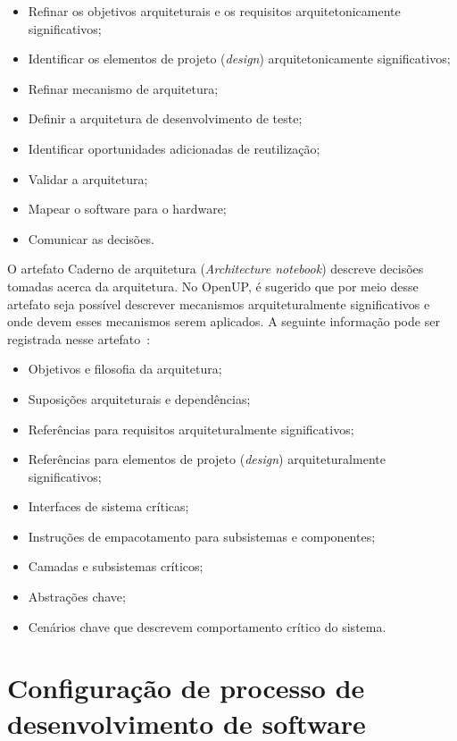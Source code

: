 \begin{itemize}
    \item Refinar os objetivos arquiteturais e os requisitos arquitetonicamente significativos;
    \item Identificar os elementos de projeto (\emph{design}) arquitetonicamente significativos;
    \item Refinar mecanismo de arquitetura;
    \item Definir a arquitetura de desenvolvimento de teste;
    \item Identificar oportunidades adicionadas de reutilização;
    \item Validar a arquitetura;
    \item Mapear o software para o hardware;
    \item Comunicar as decisões.
\end{itemize}

O artefato Caderno de arquitetura (\emph{Architecture notebook}) descreve decisões  tomadas acerca da arquitetura. No OpenUP, é sugerido que por meio desse artefato seja possível descrever mecanismos arquiteturalmente significativos e onde devem esses mecanismos serem aplicados. A seguinte informação pode ser registrada nesse artefato~\cite{openup}:

\begin{itemize}
    \item Objetivos e filosofia da arquitetura;
    \item Suposições arquiteturais e dependências;
    \item Referências para requisitos arquiteturalmente significativos;
    \item Referências para elementos de projeto (\emph{design}) arquiteturalmente significativos;
    \item Interfaces de sistema críticas;
    \item Instruções de empacotamento para subsistemas e componentes;
    \item Camadas e subsistemas críticos;
    \item Abstrações chave;
    \item Cenários chave que descrevem comportamento crítico do sistema.

\end{itemize}

\section{Configuração de processo de desenvolvimento de software}

